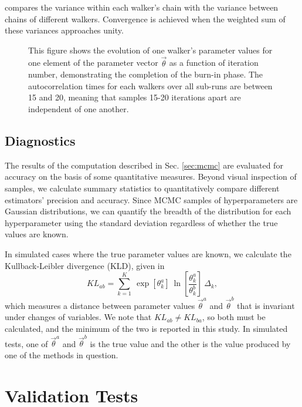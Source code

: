 \documentclass[preprint]{aastex}
\begin{document}
compares the variance within each walker's chain with the variance between 
chains of different walkers.  Convergence is achieved when the weighted sum of 
these variances approaches unity.

\begin{figure}
\caption{This figure shows the evolution of one walker's parameter values for 
one element of the parameter vector $\vec{\theta}$ as a function of iteration 
number, demonstrating the completion of the burn-in phase.  The autocorrelation 
times for each walkers over all sub-runs are between 15 and 20, meaning that 
samples 15-20 iterations apart are independent of one another.}
\label{fig:chains}
\end{figure}

\subsection{Diagnostics}
\label{sec:diag}

The results of the computation described in Sec. \ref{sec:mcmc} are evaluated 
for accuracy on the basis of some quantitative measures.  Beyond visual 
inspection of samples, we calculate summary statistics to quantitatively 
compare different estimators' precision and accuracy.  Since MCMC samples of 
hyperparameters are Gaussian distributions, we can quantify the breadth of the 
distribution for each hyperparameter using the standard deviation regardless of 
whether the true values are known.  

In simulated cases where the true parameter values are known, we calculate the 
Kullback-Leibler divergence (KLD), given in 
\begin{equation}
\label{eq:kl}
KL_{ab} = \sum_{k=1}^{K}\ \exp[\theta_{k}^{a}]\ 
\ln\left[\frac{\theta_{k}^{a}}{\theta_{k}^{b}}\right]\ \Delta_{k},
\end{equation}
which measures a distance between parameter values $\vec{\theta}^{a}$ and 
$\vec{\theta}^{b}$ that is invariant under changes of variables.  We note that 
$KL_{ab}\neq KL_{ba}$, so both must be calculated, and the minimum of the two 
is reported in this study.  In simulated tests, one of $\vec{\theta}^{a}$ and 
$\vec{\theta}^{b}$ is the true value and the other is the value produced by one 
of the methods in question.  

\section{Validation Tests}
\label{sec:valid}
\end{document}
